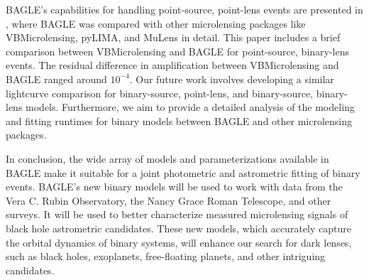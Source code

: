 \documentclass[twocolumn]{aastex701}
\begin{document}
BAGLE's capabilities for handling point-source, point-lens events are presented in \citet{Lu:2025}, where BAGLE was compared with other microlensing packages like VBMicrolensing, pyLIMA, and MuLens in detail. This paper includes a brief comparison between VBMicrolensing and BAGLE for point-source, binary-lens events. The residual difference in amplification between VBMicrolensing and BAGLE ranged around $10^{-4}$. Our future work involves developing a similar lightcurve comparison for binary-source, point-lens, and binary-source, binary-lens models. Furthermore, we aim to provide a detailed analysis of the modeling and fitting runtimes for binary models between BAGLE and other microlensing packages. 






In conclusion, the wide array of models and parameterizations available in BAGLE make it suitable for a joint photometric and astrometric fitting of binary events. BAGLE's new binary models will be used to work with data from the Vera C. Rubin Observatory, the Nancy Grace Roman Telescope, and other surveys. It will be used to better characterize measured microlensing signals of black hole astrometric candidates. These new models, which accurately capture the orbital dynamics of binary systems, will enhance our search for dark lenses, such as black holes, exoplanets, free-floating planets, and other intriguing candidates. 





\pagebreak 
\end{document}
